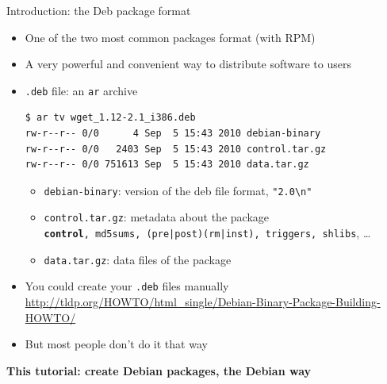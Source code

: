 \documentclass[10pt,final]{beamer}
\begin{document}
\begin{frame}[fragile]{Introduction: the Deb package format}
  \begin{itemize}
  \item One of the two most common packages format (with RPM)
  \item A very powerful and convenient way to distribute software to users
  \item \texttt{.deb} file: an \texttt{ar} archive
    \begin{lstlisting}[basicstyle=\ttfamily\footnotesize]
$ ar tv wget_1.12-2.1_i386.deb
rw-r--r-- 0/0      4 Sep  5 15:43 2010 debian-binary
rw-r--r-- 0/0   2403 Sep  5 15:43 2010 control.tar.gz
rw-r--r-- 0/0 751613 Sep  5 15:43 2010 data.tar.gz
    \end{lstlisting} %
    \begin{itemize}
    \item \texttt{debian-binary}: version of the deb file format, \texttt{"2.0\textbackslash{}n"}
    \item \texttt{control.tar.gz}: metadata about the package\\
      {\small \texttt{\textbf{control}, md5sums, (pre|post)(rm|inst), triggers, shlibs}, \ldots}
    \item \texttt{data.tar.gz}: data files of the package
    \end{itemize}
  \item You could create your \texttt{.deb} files manually\\
    {\footnotesize \url{http://tldp.org/HOWTO/html\_single/Debian-Binary-Package-Building-HOWTO/}}
  \item But most people don't do it that way
  \end{itemize}
  \hbr
  \centerline{\textbf{This tutorial: create Debian packages, the Debian way}}
\end{frame}
\end{document}

